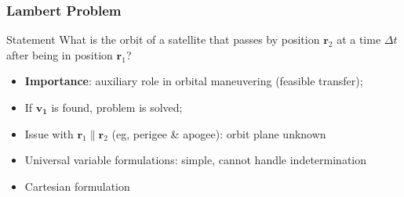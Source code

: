 \documentclass{beamer}
\begin{document}
\begin{frame}
    \frametitle{Lambert Problem}
    \begin{block}{Statement}
        What is the orbit of a satellite that passes by position \(\mathbf{r}_2\) at a time \(\Delta t\) after being in position \(\mathbf{r}_1\)?
    \end{block}
    \begin{itemize}
        \item \textbf{Importance}: auxiliary role in orbital maneuvering (feasible transfer);
        \item If \(\mathbf{v_1}\) is found, problem is solved;
        \item Issue with \(\mathbf{r}_1 \parallel \mathbf{r}_2\) (eg, perigee \& apogee): orbit plane unknown
        \item Universal variable formulations: simple, cannot handle indetermination~\cite{curtis2015orbital}\cite{sukhanov}
        \item Cartesian formulation~\cite{embedded_lambert}
    \end{itemize}
\end{frame}
\end{document}
